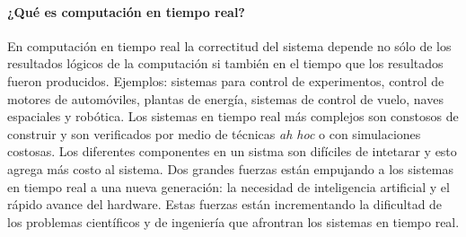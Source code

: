\paragraph{\textnormal{\textbf{¿Qué es computación en tiempo real?}}} En computación en tiempo real la correctitud del sistema depende no sólo de los resultados lógicos de la computación si también en el tiempo que los resultados fueron producidos. Ejemplos: sistemas para control de experimentos, control de motores de automóviles, plantas de energía, sistemas de control de vuelo, naves espaciales y robótica. Los sistemas en tiempo real más complejos son constosos de construir y son verificados por medio de técnicas \emph{ah hoc} o con simulaciones costosas. Los diferentes componentes en un sistma son difíciles de intetarar y esto agrega más costo al sistema. Dos grandes fuerzas están empujando a los sistemas en tiempo real a una nueva generación: la necesidad de inteligencia artificial y el rápido avance del hardware. Estas fuerzas están incrementando la dificultad de los problemas científicos y de ingeniería que afrontran los sistemas en tiempo real.

